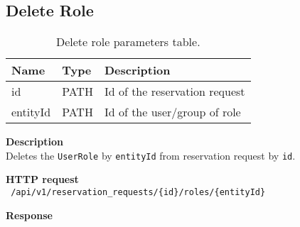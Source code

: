 \subsection{Delete Role}
\begin{table}[ht!]
    \begin{tabularx}{\textwidth}{llX}
        \toprule
        Name & Type & Description \\
        \midrule
        id & PATH & Id of the reservation request \\
        entityId & PATH & Id of the user/group of role \\
        \end{tabularx}
    \caption{Delete role parameters table.}
\end{table}
\begin{description}
    \item \textbf{Description}\\
        Deletes the \texttt{UserRole} by \texttt{entityId} from reservation request by \texttt{id}.
    \item \textbf{HTTP request}\\
        \texttt{\text{[DELETE]} /api/v1/reservation\_requests/\{id\}/roles/\{entityId\}}
    \item \textbf{Response}\\
        \texttt{\text{[200 OK]}}
\end{description}